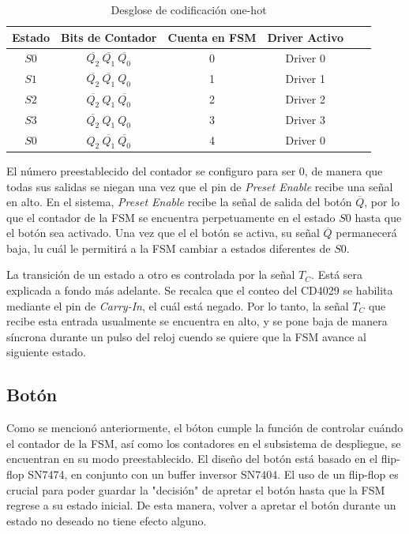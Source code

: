 \documentclass[12pt,onecolumn]{IEEEtran}
\begin{document}
\begin{table}[H]
\centering
\caption{Desglose de codificación one-hot}
\label{tab:Drivers/Estados}
\begin{tabular}{cccccc}
\toprule
\textbf{Estado} & \textbf{Bits de Contador} & \textbf{Cuenta en FSM} & \textbf{Driver Activo} \\
\midrule
$S0$ & $\overline{Q_2}~\overline{Q_1}~ \overline{Q_0}$ & 0 & Driver 0 \\
$S1$ & $\overline{Q_2}~\overline{Q_1} ~Q_0$ & 1 & Driver 1 \\
$S2$ & $\overline{Q_2}~Q_1 ~\overline{Q_0}$ & 2 & Driver 2 \\
$S3$ & $\overline{Q_2}~Q_1 ~Q_0$ & 3 & Driver 3 \\
$S0$ & $Q_2~\overline{Q_1}~ \overline{Q_0}$ & 4 & Driver 0 \\
\bottomrule
\end{tabular}
\end{table}


El número preestablecido del contador se configuro para ser 0, de manera que todas sus salidas se niegan una vez que el pin de \textit{Preset Enable} recibe una señal en alto. En el sistema, \textit{Preset Enable} recibe la señal de salida del botón $\overline{Q}$, por lo que el contador de la FSM se encuentra perpetuamente en el estado $S0$ hasta que el botón sea activado. Una vez que el el botón se activa, su señal $\overline{Q}$ permanecerá baja, lu cuál le permitirá a la FSM cambiar a estados diferentes de $S0$.


La transición de un estado a otro es controlada por la señal $T_C$. Está sera explicada a fondo más adelante. Se recalca que el conteo del CD4029 se habilita mediante el pin de \textit{Carry-In}, el cuál está negado. Por lo tanto, la señal $T_C$ que recibe esta entrada usualmente se encuentra en alto, y se pone baja de manera síncrona durante un pulso del reloj cuendo se quiere que la FSM avance al siguiente estado. 

\subsection{Botón}

Como se mencionó anteriormente, el bóton cumple la función de controlar cuándo el contador de la FSM, así como los contadores en el subsistema de despliegue, se encuentran en su modo preestablecido. El diseño del botón está basado en el flip-flop SN7474, en conjunto con un buffer inversor SN7404. El uso de un flip-flop es crucial para poder guardar la "decisión" de apretar el botón hasta que la FSM regrese a su estado inicial. De esta manera, volver a apretar el botón durante un estado no deseado no tiene efecto alguno.
\end{document}
